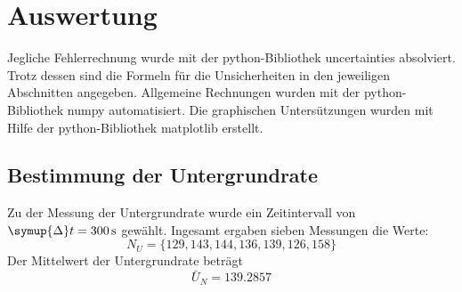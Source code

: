 \section{Auswertung}
\label{sec:Auswertung}
Jegliche Fehlerrechnung wurde mit der python-Bibliothek uncertainties \cite{uncertainties} absolviert.
Trotz dessen sind die Formeln für die Unsicherheiten in den jeweiligen Abschnitten angegeben.
Allgemeine Rechnungen wurden mit der python-Bibliothek numpy \cite{numpy} automatisiert. 
Die graphischen Untersützungen wurden mit Hilfe der python-Bibliothek matplotlib \cite{matplotlib} erstellt.
\subsection{Bestimmung der Untergrundrate}
Zu der Messung der Untergrundrate wurde ein Zeitintervall von $\symup{\Delta} t = \SI{300}{\second}$ gewählt.
Ingesamt ergaben sieben Messungen die Werte:
\begin{equation*}
    N_U = \{ 129, 143, 144, 136, 139, 126, 158 \}
\end{equation*}
Der Mittelwert der Untergrundrate beträgt
\begin{equation*}
    \bar{U}_N = 139.2857
\end{equation*}
